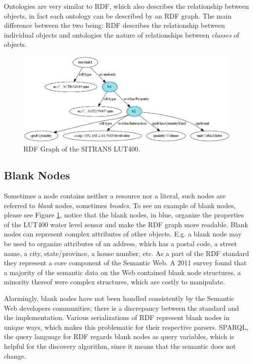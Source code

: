 Ontologies are very similar to RDF, which also describes the relationship between objects, in fact each ontology can be described by an RDF graph. The main difference between the two being: RDF describes the relationship between individual objects and ontologies the nature of relationships between \textit{classes} of objects. \cite{Synak.2009}


\begin{figure}[th]
\centering
\includegraphics[width=\textwidth]{Figures/lut400}
\caption[The RDF Graph for the LUT400]{RDF Graph of the SITRANS LUT400.}
\label{fig:rdflut400}
\end{figure}



\subsection{Blank Nodes}
\label{sec:blanknodes}
Sometimes a node contains neither a resource nor a literal, such nodes are referred to \textit{blank} nodes, sometimes \textit{bnodes}. To see an example of blank nodes, please see Figure \ref{fig:rdflut400}, notice that the blank nodes, in blue, organize the properties of the LUT400 water level sensor and make the RDF graph more readable. Blank nodes can represent complex attributes of other objects\cite{chen2012blank}. E.g. a blank node may be used to organize attributes of an address, which has a postal code, a street name, a city, state/province, a house number, etc. As a part of the RDF standard they represent a core component of the Semantic Web. A 2011 survey found that a majority of the semantic data on the Web contained blank node structures, a minority thereof were complex structures, which are costly to manipulate. \cite{Mallea.2011}

Alarmingly, blank nodes have not been handled consistently by the Semantic Web developers communities; there is a discrepancy between the standard and the implementation. Various serializations of RDF represent blank nodes in unique ways, which makes this problematic for their respective parsers. SPARQL, the query language for RDF regards blank nodes as query variables, which is helpful for the discovery algorithm, since it means that the semantic does not change.

